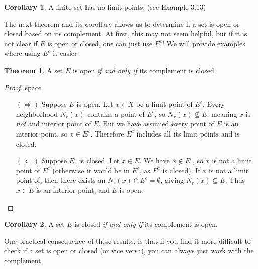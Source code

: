 \documentclass{article}
\theoremstyle{definition}
\newtheorem{theorem}{Theorem}[section]
\newtheorem{corollary}{Corollary}[section]
\begin{document}
	\begin{corollary}
		A finite set has no limit points. (see Example 3.13)
	\end{corollary}
	The next theorem and its corollary allows us to determine if a set is open or closed based on its complement. At first, this may not seem helpful, but if it is not clear if $ E $ is open or closed, one can just use $ E^c $! We will provide examples where using $ E^c $ is easier.
	\begin{theorem}
		A set $ E $ is open \textit{if and only if} its complement is closed.
	\end{theorem}
	\begin{proof}{\color{white}space}
		\begin{enumerate}
			\item [$ (\Longrightarrow) $] Suppose $ E $ is open. Let $ x\in X $ be a limit point of $ E^c $. Every neighborhood $ N_r(x) $ contains a point of $ E^c $, so $ N_r(x)\not\subseteq E $, meaning $ x $ is \textit{not} and interior point of $ E $. But we have assumed every point of $ E $ is an interior point, so $ x\in E^c $. Therefore $ E^c $ includes all its limit points and is closed.   
			\item [$ (\Longleftarrow) $] Suppose $ E^c $ is closed. Let $ x\in E $. We have $ x\notin E^c $, so $ x $ is not a limit point of $ E^c $ (otherwise it would be in $ E^c $, as $ E^c $ is closed). If $ x $ is not a limit point of, then there exists an $ N_r(x)\cap E^c=\emptyset $, giving $ N_r(x)\subseteq E $. Thus $ x\in E $ is an interior point, and $ E $ is open.  
		\end{enumerate}
	\end{proof}
	\begin{corollary}
		A set $ E $ is closed \textit{if and only if} its complement is open.
	\end{corollary}
	One practical consequence of these results, is that if you find it more difficult to check if a set is open or closed (or vice versa), you can always just work with the complement. 
	
\end{document}
